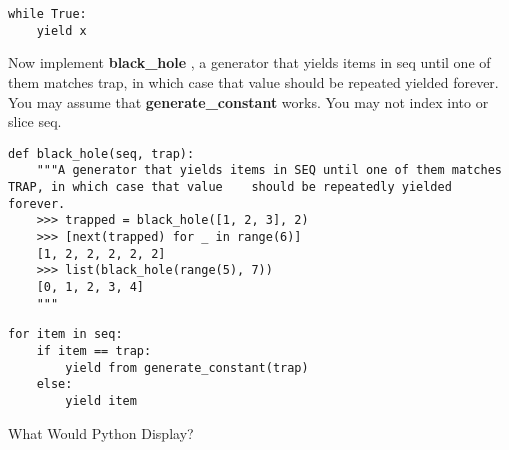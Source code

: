 \begin{solution}
\begin{verbatim}
while True: 
    yield x
 \end{verbatim}
\end{solution}




 Now implement  \textbf{black\_hole} , a generator that yields items in seq until one of them matches trap, in which case that value should be repeated yielded forever. You may assume that  \textbf{generate\_constant}  works. You may not index into or slice seq.

\begin{lstlisting}
def black_hole(seq, trap):
	"""A generator that yields items in SEQ until one of them matches TRAP, in which case that value 	should be repeatedly yielded forever.
	>>> trapped = black_hole([1, 2, 3], 2)
	>>> [next(trapped) for _ in range(6)]
	[1, 2, 2, 2, 2, 2]
	>>> list(black_hole(range(5), 7))
	[0, 1, 2, 3, 4]
	"""
\end{lstlisting}

\begin{solution} [.5in]
\begin{lstlisting}
for item in seq:
	if item == trap:
		yield from generate_constant(trap)
	else:
		yield item

 \end{lstlisting}
\end{solution}
\newpage




\question
What Would Python Display?


